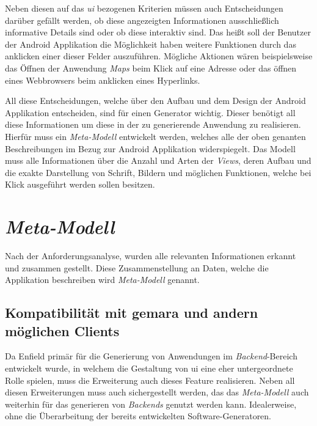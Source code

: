 Neben diesen auf das \textit{\acf{ui}} bezogenen Kriterien müssen auch Entscheidungen darüber gefällt werden, ob diese angezeigten Informationen ausschließlich informative Details sind oder ob diese interaktiv sind. Das heißt soll der Benutzer der Android Applikation die Möglichkeit haben weitere Funktionen durch das anklicken einer dieser Felder auszuführen. Mögliche Aktionen wären beispielsweise das Öffnen der Anwendung \textit{Maps} beim Klick auf eine Adresse oder das öffnen eines Webbrowsers beim anklicken eines Hyperlinks. 

All diese Entscheidungen, welche über den Aufbau und dem Design der Android Applikation entscheiden, sind für einen Generator wichtig. Dieser benötigt all diese Informationen um diese in der zu generierende Anwendung zu realisieren. Hierfür muss ein \textit{Meta-Modell} entwickelt werden, welches alle der oben genanten Beschreibungen im Bezug zur Android Applikation widerspiegelt. Das Modell muss alle Informationen über die Anzahl und Arten der \textit{Views}, deren Aufbau und die exakte Darstellung von Schrift, Bildern und möglichen Funktionen, welche bei Klick ausgeführt werden sollen besitzen.

\section{\textit{Meta-Modell}}
Nach der Anforderungsanalyse, wurden alle relevanten Informationen erkannt und zusammen gestellt. Diese Zusammenstellung an Daten, welche die Applikation beschreiben wird \textit{Meta-Modell} genannt.

\subsection{Kompatibilität mit \acs{gemara} und andern möglichen Clients}
Da Enfield primär für die Generierung von Anwendungen im \textit{Backend}-Bereich entwickelt wurde, in welchem die Gestaltung von \acf{ui} eine eher untergeordnete Rolle spielen, muss die Erweiterung auch dieses Feature realisieren. Neben all diesen Erweiterungen muss auch sichergestellt werden, das das \textit{Meta-Modell} auch weiterhin für das generieren von \textit{Backends} genutzt werden kann. Idealerweise, ohne die Überarbeitung der bereits entwickelten Software-Generatoren. 

